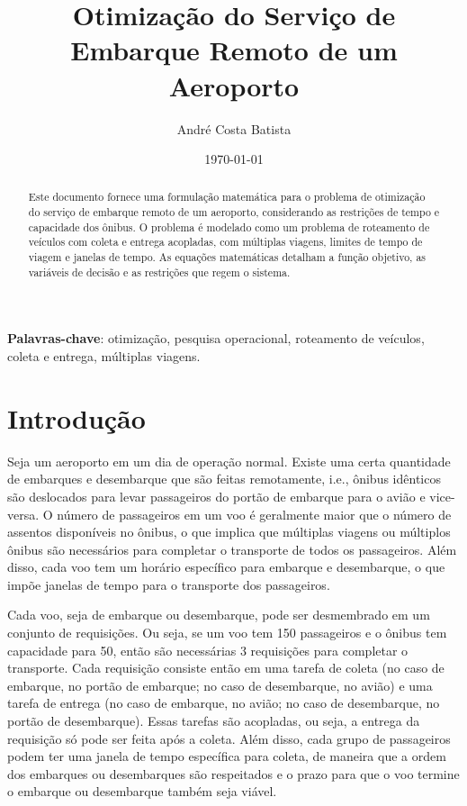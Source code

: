 \documentclass[12pt, a4paper]{article}
\title{Otimização do Serviço de Embarque Remoto de um Aeroporto}
\author{André Costa Batista}
\date{\today}
\begin{document}
\maketitle

\begin{abstract}
    Este documento fornece uma formulação matemática para o problema de otimização do serviço de embarque remoto de um aeroporto, considerando as restrições de tempo e capacidade dos ônibus. O problema é modelado como um problema de roteamento de veículos com coleta e entrega acopladas, com múltiplas viagens, limites de tempo de viagem e janelas de tempo. As equações matemáticas detalham a função objetivo, as variáveis de decisão e as restrições que regem o sistema.
\end{abstract}

\noindent \textbf{Palavras-chave}: otimização, pesquisa operacional, roteamento de veículos, coleta e entrega, múltiplas viagens.

\section{Introdução}

Seja um aeroporto em um dia de operação normal. Existe uma certa quantidade de embarques e desembarque que são feitas remotamente, i.e., ônibus idênticos são deslocados para levar passageiros do portão de embarque para o avião e vice-versa. O número de passageiros em um voo é geralmente maior que o número de assentos disponíveis no ônibus, o que implica que múltiplas viagens ou múltiplos ônibus são necessários para completar o transporte de todos os passageiros. Além disso, cada voo tem um horário específico para embarque e desembarque, o que impõe janelas de tempo para o transporte dos passageiros.

Cada voo, seja de embarque ou desembarque, pode ser desmembrado em um conjunto de requisições. Ou seja, se um voo tem 150 passageiros e o ônibus tem capacidade para 50, então são necessárias 3 requisições para completar o transporte. Cada requisição consiste então em uma tarefa de coleta (no caso de embarque, no portão de embarque; no caso de desembarque, no avião) e uma tarefa de entrega (no caso de embarque, no avião; no caso de desembarque, no portão de desembarque). Essas tarefas são acopladas, ou seja, a entrega da requisição só pode ser feita após a coleta. Além disso, cada grupo de passageiros podem ter uma janela de tempo específica para coleta, de maneira que a ordem dos embarques ou desembarques são respeitados e o prazo para que o voo termine o embarque ou desembarque também seja viável.
\end{document}
